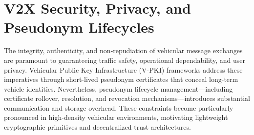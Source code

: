 \section{V2X Security, Privacy, and Pseudonym Lifecycles}
\label{sec:security_privacy}

The integrity, authenticity, and non-repudiation of vehicular message exchanges are paramount to guaranteeing traffic safety, operational dependability, and user privacy.
Vehicular Public Key Infrastructure (V-PKI) frameworks address these imperatives through short-lived pseudonym certificates that conceal long-term vehicle identities.
Nevertheless, pseudonym lifecycle management—including certificate rollover, resolution, and revocation mechanisms—introduces substantial communication and storage overhead.
These constraints become particularly pronounced in high-density vehicular environments, motivating lightweight cryptographic primitives and decentralized trust architectures.

